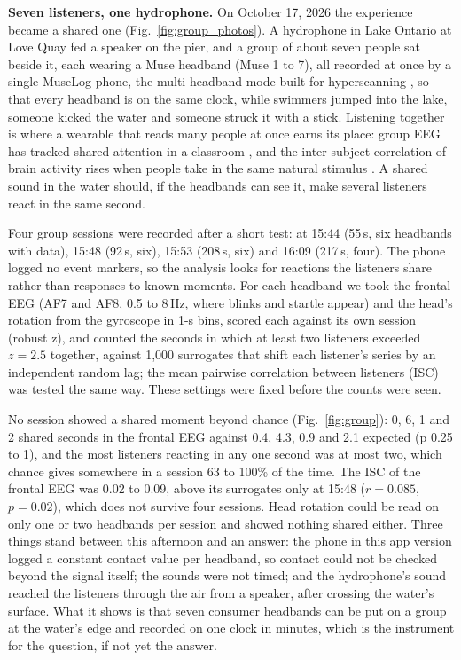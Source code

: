 \documentclass[conference]{IEEEtran}
\begin{document}
\textbf{Seven listeners, one hydrophone.} On October 17, 2026 the experience became a shared one (Fig.~\ref{fig:group_photos}). A hydrophone in Lake Ontario at Love Quay fed a speaker on the pier, and a group of about seven people sat beside it, each wearing a Muse headband (Muse 1 to 7), all recorded at once by a single MuseLog phone, the multi-headband mode built for hyperscanning \cite{vicol2025muselogsymp}, so that every headband is on the same clock, while swimmers jumped into the lake, someone kicked the water and someone struck it with a stick. Listening together is where a wearable that reads many people at once earns its place: group EEG has tracked shared attention in a classroom \cite{dikker2017classroom}, and the inter-subject correlation of brain activity rises when people take in the same natural stimulus \cite{hasson2004isc}. A shared sound in the water should, if the headbands can see it, make several listeners react in the same second.

Four group sessions were recorded after a short test: at 15:44 (55\,s, six headbands with data), 15:48 (92\,s, six), 15:53 (208\,s, six) and 16:09 (217\,s, four). The phone logged no event markers, so the analysis looks for reactions the listeners share rather than responses to known moments. For each headband we took the frontal EEG (AF7 and AF8, 0.5 to 8\,Hz, where blinks and startle appear) and the head's rotation from the gyroscope in 1-s bins, scored each against its own session (robust z), and counted the seconds in which at least two listeners exceeded $z = 2.5$ together, against 1{,}000 surrogates that shift each listener's series by an independent random lag; the mean pairwise correlation between listeners (ISC) was tested the same way. These settings were fixed before the counts were seen.

No session showed a shared moment beyond chance (Fig.~\ref{fig:group}): 0, 6, 1 and 2 shared seconds in the frontal EEG against 0.4, 4.3, 0.9 and 2.1 expected (p 0.25 to 1), and the most listeners reacting in any one second was at most two, which chance gives somewhere in a session 63 to 100\% of the time. The ISC of the frontal EEG was 0.02 to 0.09, above its surrogates only at 15:48 ($r = 0.085$, $p = 0.02$), which does not survive four sessions. Head rotation could be read on only one or two headbands per session and showed nothing shared either. Three things stand between this afternoon and an answer: the phone in this app version logged a constant contact value per headband, so contact could not be checked beyond the signal itself; the sounds were not timed; and the hydrophone's sound reached the listeners through the air from a speaker, after crossing the water's surface. What it shows is that seven consumer headbands can be put on a group at the water's edge and recorded on one clock in minutes, which is the instrument for the question, if not yet the answer.
\end{document}
